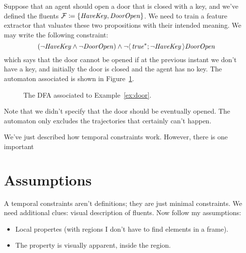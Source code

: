 \begin{example}
	Suppose that an agent should open a door that is closed with a key, and
	we've defined the fluents $\mathcal{F} \coloneqq \{\text{\textit{HaveKey}},
	\text{\textit{DoorOpen}}\}$. We need to train a feature extractor that valuates these
	two propositions with their intended meaning. We may write the following
	constraint:
	\[
		(\neg \text{\textit{HaveKey}} \land \neg \text{\textit{DoorOpen}})
		\land \neg \langle\, {\text{\textit{true}}^*; \neg \text{\textit{HaveKey}}} \,\rangle\text{\textit{DoorOpen}}
	\]
	which says that the door cannot be opened if at the previous instant we
	don't have a key, and initially the door is closed and the agent has no key.
	The automaton associated is shown in Figure~\ref{fig:door-automa}.
	\begin{figure}
			\centering
			\caption{The DFA associated to Example~\ref{ex:door}.}
			\label{fig:door-automa}
	\end{figure}
	Note that we didn't specify that the door should be eventually opened. The
	automaton only excludes the trajectories that certainly can't happen.
	\label{ex:door}
\end{example}

We've just described how temporal constraints work. However, there is one
important 



\section{Assumptions}

\label{sec:fluents-assumptions}

A temporal constraints aren't definitions; they are just minimal constraints.
We need additional clues: visual description of fluents.
Now follow my assumptions:
\begin{itemize}
	\item Local propertes (with regions I don't have to find elements in a
		frame).
	\item The property is visually apparent, inside the region.
\end{itemize}

